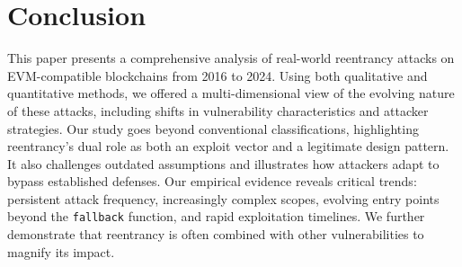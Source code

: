 \section{Conclusion}

This paper presents a comprehensive analysis of \ReentrancyTotalAnalyzed{} real-world reentrancy attacks on EVM-compatible blockchains from 2016 to 2024. Using both qualitative and quantitative methods, we offered a multi-dimensional view of the evolving nature of these attacks, including shifts in vulnerability characteristics and attacker strategies. Our study goes beyond conventional classifications, highlighting reentrancy's dual role as both an exploit vector and a legitimate design pattern. It also challenges outdated assumptions and illustrates how attackers adapt to bypass established defenses.
%
Our empirical evidence reveals critical trends: persistent attack frequency, increasingly complex scopes, evolving entry points beyond the \lstinline{fallback} function, and rapid exploitation timelines. We further demonstrate that reentrancy is often combined with other vulnerabilities to magnify its impact.

